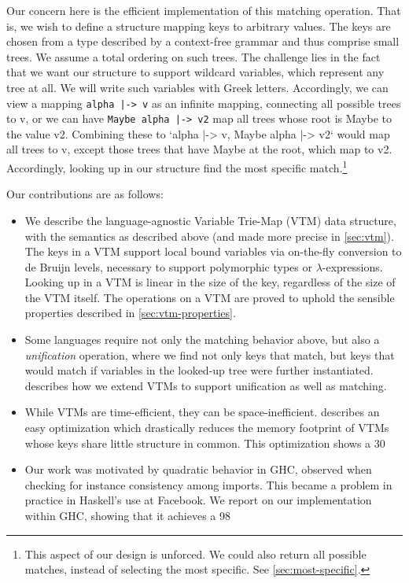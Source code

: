 \documentclass[acmsmall]{acmart}
\theoremstyle{theorem}
\theoremstyle{definition}
\theoremstyle{remark}
\begin{document}
Our concern here is the efficient implementation of this matching
operation. That is, we wish to define a structure mapping keys to
arbitrary values. The keys are chosen from a type described by a
context-free grammar and thus comprise small trees. We assume a total
ordering on such trees. The challenge lies in the fact that we want
our structure to support wildcard variables, which represent any tree
at all. We will write such variables with Greek letters. Accordingly,
we can view a mapping \lstinline{alpha |-> v} as an infinite mapping, connecting
all possible trees to v, or we can have \lstinline{Maybe alpha |-> v2} map all
trees whose root is Maybe to the value v2. Combining these to `alpha
|-> v, Maybe alpha |-> v2` would map all trees to v, except those
trees that have Maybe at the root, which map to v2. Accordingly,
looking up in our structure find the most specific
match.\footnote{This aspect of our design is unforced. We could also
return all possible matches, instead of selecting the most
specific. See \cref{sec:most-specific}.}

Our contributions are as follows:

\begin{itemize}
\item We describe the language-agnostic Variable Trie-Map (VTM) data structure, with the semantics as described above (and made more precise in \cref{sec:vtm}). The keys in a VTM support local bound variables via on-the-fly conversion to de Bruijn levels, necessary to support polymorphic types or $\lambda$-expressions. Looking up in a VTM is linear in the size of the key, regardless of the size of the VTM itself. The operations on a VTM are proved to uphold the sensible properties described in \cref{sec:vtm-properties}.
\item Some languages require not only the matching behavior above, but also a \emph{unification} operation, where we find not only keys that match, but keys that would match if variables in the looked-up tree were further instantiated.  describes how we extend VTMs to support unification as well as matching.
\item While VTMs are time-efficient, they can be space-inefficient.  describes an easy optimization which drastically reduces the memory footprint of VTMs whose keys share little structure in common. This optimization shows a 30%
\item Our work was motivated by quadratic behavior in GHC, observed when checking for instance consistency among imports. This became a problem in practice in Haskell's use at Facebook. We report on our implementation within GHC, showing that it achieves a 98%
\end{itemize}
\end{document}
